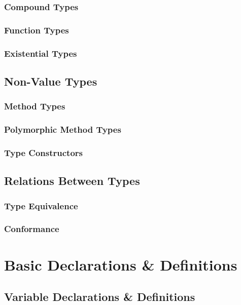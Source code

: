 \subsection{Compound Types}

\subsection{Function Types}

\subsection{Existential Types}

\section{Non-Value Types}

\subsection{Method Types}

\subsection{Polymorphic Method Types}

\subsection{Type Constructors}

\section{Relations Between Types}

\subsection{Type Equivalence}

\subsection{Conformance}

\chapter{Basic Declarations \& Definitions}

\section{Variable Declarations \& Definitions}

